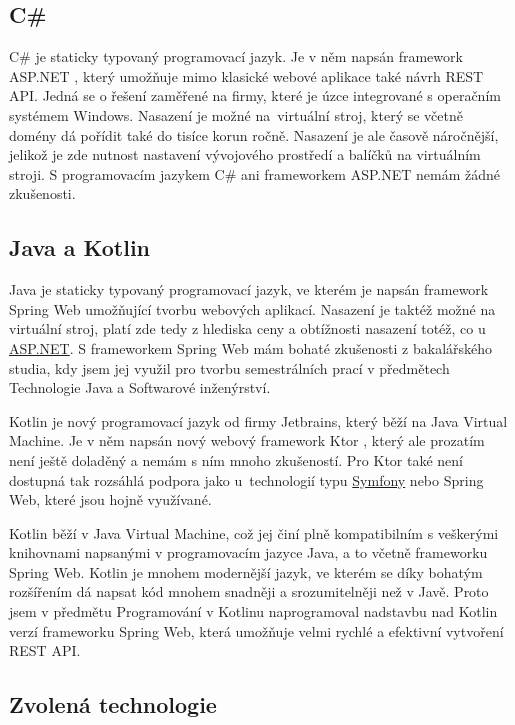 \subsection{C\#}
\label{asp-net}

C\# \cite{csharp} je staticky typovaný programovací jazyk. Je v něm napsán framework ASP.NET \cite{dotnet}, který umožňuje mimo klasické webové aplikace také návrh REST API. Jedná se o řešení zaměřené na firmy, které je úzce integrované s operačním systémem Windows. Nasazení je možné na~virtu\-ální stroj, který se včetně domény dá pořídit také do tisíce korun ročně. Nasazení je ale časově náročnější, jelikož je zde nutnost nastavení vývojového prostředí a balíčků na virtuálním stroji. S programovacím jazykem C\# ani frameworkem ASP.NET nemám žádné zkušenosti.

\subsection{Java a Kotlin}

Java \cite{java} je staticky typovaný programovací jazyk, ve kterém je napsán framework Spring Web \cite{spring-web} umožňující tvorbu webových aplikací. Nasazení je taktéž možné na virtuální stroj, platí zde tedy z hlediska ceny a obtížnosti nasazení totéž, co u \hyperref[asp-net]{ASP.NET}. S frameworkem Spring Web mám bohaté zkušenosti z bakalářského studia, kdy jsem jej využil pro tvorbu semestrálních prací v předmětech Technologie Java a Softwarové inženýrství.

Kotlin \cite{kotlin} je nový programovací jazyk od firmy Jetbrains, který běží na Java Virtual Machine. Je v něm napsán nový webový framework Ktor \cite{ktor}, který ale prozatím není ještě doladěný a nemám s ním mnoho zkušeností. Pro Ktor také není dostupná tak rozsáhlá podpora jako u~technologií typu \hyperref[symfony]{Symfony} nebo Spring Web, které jsou hojně využívané.

Kotlin běží v Java Virtual Machine, což jej činí plně kompatibilním s veškerými knihovnami napsanými v programovacím jazyce Java, a to včetně frameworku Spring Web. Kotlin je mnohem modernější jazyk, ve kterém se díky bohatým rozšířením dá napsat kód mnohem snadněji a srozumitelněji než v Javě. Proto jsem v předmětu Programování v Kotlinu naprogramoval nadstavbu nad Kotlin verzí frameworku Spring Web, která umožňuje velmi rychlé a efektivní vytvoření REST API.

\subsection{Zvolená technologie}

